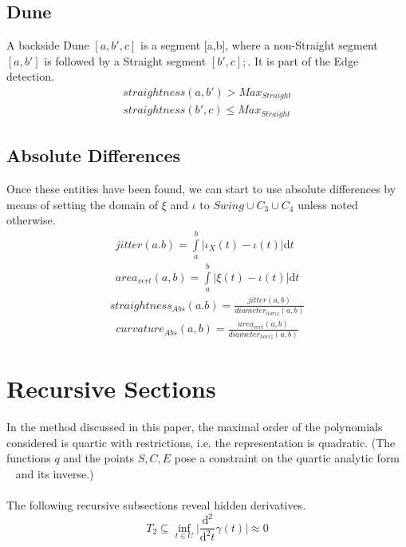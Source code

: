 \documentclass{report}
\begin{document}
\subsection{Dune}
A backside Dune $[a,b',c]$ is a segment [a,b], where a non-Straight segment $[a,b']$ is followed by a Straight segment $[b',c]; $. It is part of the Edge detection.
\begin{align}
straightness(a,b')>Max_{Straight}\\ straightness(b',c)\leq Max_{Straight}
\end{align}

\subsection*{Absolute Differences}
Once these entities have been found, we can start to use absolute differences by means of setting the domain of $\xi$ and $\iota$ to $Swing \cup C_{3} \cup C_{4}$ unless noted otherwise.
\begin{align}
jitter(a.b)=\int \limits _{a}^{b}\lvert \iota_{X}(t) - \iota(t) \rvert \mathrm{d}t\\
area_{vert}(a,b)=\int \limits _{a}^{b} \lvert \xi(t)-\iota(t) \rvert \mathrm{d}t
\end{align}
\begin{align}
straightness_{Abs}(a.b)=\frac{jitter(a,b)}{diameter_{horiz}(a,b)}
\end{align}
\begin{align}
curvature_{Abs}(a,b) = \frac{area_{vert}(a,b)}{diameter_{horiz}(a,b)}
\end{align}

\section{Recursive Sections}
In the method discussed in this paper, the maximal order of the polynomials considered is quartic with restrictions, i.e. the representation is quadratic.  (The functions $q$ and the points $S,C,E$ pose a constraint on the quartic analytic form ~\cite[Spline\_CharacteristicPolynomials.nb]{Stopeight} and its inverse.)\\\\
The following recursive subsections reveal hidden derivatives.
\begin{equation}
T_{2} \subseteq \inf_{t \in U} \lvert \frac{\mathrm{d}^2}{\mathrm{d}^2t}\gamma(t) \rvert \approx 0
\end{equation}
\end{document}
